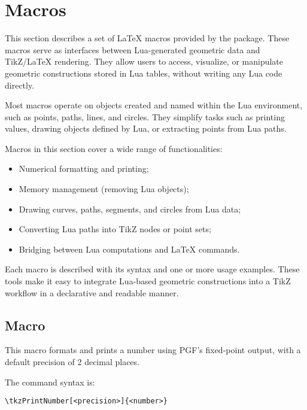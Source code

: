 \newpage
\section{Macros} %
\label{sec:macros}

This section describes a set of LaTeX macros provided by the  package. These macros serve as interfaces between Lua-generated geometric data and TikZ/LaTeX rendering. They allow users to access, visualize, or manipulate geometric constructions stored in Lua tables, without writing any Lua code directly.

Most macros operate on objects created and named within the Lua environment, such as points, paths, lines, and circles. They simplify tasks such as printing values, drawing objects defined by Lua, or extracting points from Lua paths.

Macros in this section cover a wide range of functionalities:
\begin{itemize}
\item Numerical formatting and printing;
\item Memory management (removing Lua objects);
\item Drawing curves, paths, segments, and circles from Lua data;
\item Converting Lua paths into TikZ nodes or point sets;
\item Bridging between Lua computations and LaTeX commands.
\end{itemize}

Each macro is described with its syntax and one or more usage examples. These tools make it easy to integrate Lua-based geometric constructions into a TikZ workflow in a declarative and readable manner.



\subsection{Macro } %
\label{sub:macro_tkzPrintNumber}

This macro formats and prints a number using PGF’s fixed-point output, with a default precision of 2 decimal places.

\medskip
\noindent
The command syntax is:

\begin{verbatim}
\tkzPrintNumber[<precision>]{<number>}
\end{verbatim}

